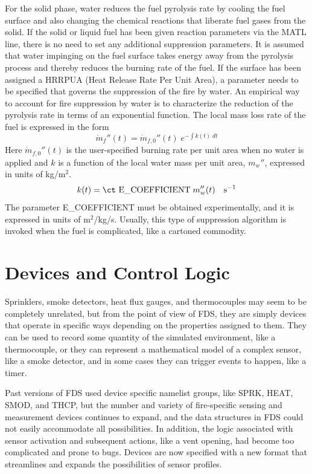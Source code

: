 \documentclass[11pt]{book}
\newcommand{\dm}{\dot{m}}
\newcommand{\be}{\begin{equation}}
\newcommand{\ee}{\end{equation}}
\begin{document}
For the solid phase,
water reduces the fuel pyrolysis rate by cooling the fuel surface and also
changing the chemical reactions that liberate fuel gases from the solid.
If the solid or liquid fuel has been given reaction parameters via the {\ct MATL} line, there is no
need to set any additional suppression parameters. It is assumed that
water impinging on the fuel surface takes energy away from the
pyrolysis process and thereby reduces the burning rate of the fuel.
If the surface has been assigned a {\ct HRRPUA} (Heat Release Rate Per Unit Area),
a parameter needs to be specified that governs the suppression of the fire by water.
An empirical way to account for fire suppression by water
is to characterize the reduction of the pyrolysis rate in terms
of an exponential function. The local mass loss rate of the
fuel is expressed in the form
\be \dm_f''(t) = \dm_{f,0}''(t) \; e^{-\int k(t) \; dt} \label{nistexting} \ee
Here $\dm_{f,0}''(t)$ is the user-specified burning rate per unit
area when no water is applied and $k$ is a function of the local water
mass per unit area, $m_w''$, expressed in units of kg/m$^2$.
\be
k(t) = \hbox{\ct E\_COEFFICIENT} \; m_w''(t) \quad          \hbox{s}^{-1}
\ee
The parameter {\ct E\_COEFFICIENT} must be obtained experimentally, and
it is expressed in units of m$^2$/kg/s. Usually, this type of suppression
algorithm is invoked when the fuel is complicated, like a cartoned commodity.








\clearpage

\chapter{Devices and Control Logic}

Sprinklers, smoke detectors, heat flux gauges, and thermocouples
may seem to be completely unrelated, but from the point of view
of FDS, they are simply devices that operate in specific ways depending
on the properties assigned to them. They can be used to record some
quantity of the simulated environment, like a thermocouple, or they can represent a mathematical model
of a complex sensor, like a smoke detector,
and in some cases they can trigger events to happen, like a timer.

Past versions of FDS used device specific namelist groups, like {\ct SPRK},
{\ct HEAT}, {\ct SMOD}, and {\ct THCP}, but the number and variety
of fire-specific sensing and measurement devices continues to expand, and
the data structures in FDS could not easily accommodate all possibilities.
In addition, the logic associated with sensor activation and
subsequent actions, like a vent opening, had become too complicated and prone to bugs.
Devices are now specified with a new format that streamlines and expands the possibilities of sensor profiles.
\end{document}

